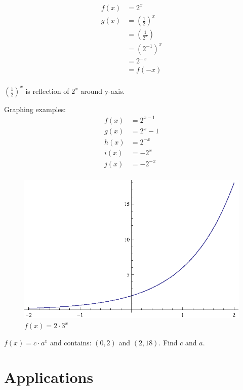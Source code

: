 \documentclass{exam}
\begin{document}
  \begin{align*}
    f(x) &= 2^x \\
    g(x) &= \left( \frac{1}{2} \right)^x \\
         &= \left( \frac{1}{2^x} \right) \\
         &= \left( 2^{-1} \right)^x \\
         &= 2^{-x} \\
         &= f(-x) \\
  \end{align*}

  $\left( \frac{1}{2} \right)^x$ is reflection of $2^x$ around y-axis.

  Graphing examples:
  \begin{align*}
    f(x) &= 2^{x - 1} \\
    g(x) &= 2^x - 1 \\
    h(x) &= 2^{-x} \\
    i(x) &= -2^x \\
    j(x) &= -2^{-x} \\
  \end{align*}

  \pagebreak

  \begin{figure}[h]
    \centering
    \includegraphics{figure1.eps}
    \caption{$f(x) = 2 \cdot 3^x$}
    \label{fig:figure1}
  \end{figure}

  $f(x) = c \cdot a^x$ and contains: $(0, 2)$ and $(2, 18)$.  Find $c$ and $a$.

  \section{Applications}
\end{document}
